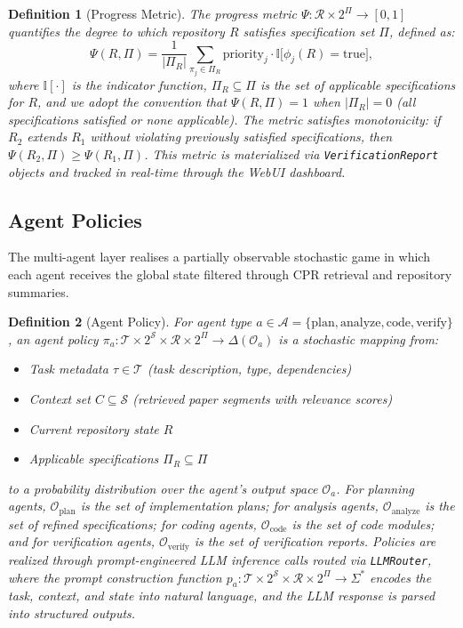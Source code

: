 \documentclass{ieeeaccess}
\newtheorem{definition}{Definition}
\begin{document}
\begin{definition}[Progress Metric]
The progress metric \(\Psi: \mathcal{R} \times 2^{\Pi} \to [0,1]\) quantifies the degree to which repository \(R\) satisfies specification set \(\Pi\), defined as:
\begin{equation}
\Psi(R, \Pi) = \frac{1}{|\Pi_R|} \sum_{\pi_j \in \Pi_R} \text{priority}_j \cdot \mathbb{I}\bigl[\phi_j(R) = \text{true}\bigr],
\label{eq:progress}
\end{equation}
where \(\mathbb{I}[\cdot]\) is the indicator function, \(\Pi_R \subseteq \Pi\) is the set of applicable specifications for \(R\), and we adopt the convention that \(\Psi(R, \Pi) = 1\) when \(|\Pi_R| = 0\) (all specifications satisfied or none applicable). The metric satisfies monotonicity: if \(R_2\) extends \(R_1\) without violating previously satisfied specifications, then \(\Psi(R_2, \Pi) \geq \Psi(R_1, \Pi)\). This metric is materialized via \texttt{VerificationReport} objects and tracked in real-time through the WebUI dashboard.
\end{definition}

\subsection{Agent Policies}
The multi-agent layer realises a partially observable stochastic game in which each agent receives the global state filtered through CPR retrieval and repository summaries.

\begin{definition}[Agent Policy]
For agent type \(a \in \mathcal{A} = \{\text{plan}, \text{analyze}, \text{code}, \text{verify}\}\), an agent policy \(\pi_a: \mathcal{T} \times 2^{\mathcal{S}} \times \mathcal{R} \times 2^{\Pi} \to \Delta(\mathcal{O}_a)\) is a stochastic mapping from:
\begin{itemize}
\item Task metadata \(\tau \in \mathcal{T}\) (task description, type, dependencies)
\item Context set \(C \subseteq \mathcal{S}\) (retrieved paper segments with relevance scores)
\item Current repository state \(R\)
\item Applicable specifications \(\Pi_R \subseteq \Pi\)
\end{itemize}
to a probability distribution over the agent's output space \(\mathcal{O}_a\). For planning agents, \(\mathcal{O}_{\text{plan}}\) is the set of implementation plans; for analysis agents, \(\mathcal{O}_{\text{analyze}}\) is the set of refined specifications; for coding agents, \(\mathcal{O}_{\text{code}}\) is the set of code modules; and for verification agents, \(\mathcal{O}_{\text{verify}}\) is the set of verification reports. Policies are realized through prompt-engineered LLM inference calls routed via \texttt{LLMRouter}, where the prompt construction function \(p_a: \mathcal{T} \times 2^{\mathcal{S}} \times \mathcal{R} \times 2^{\Pi} \to \Sigma^*\) encodes the task, context, and state into natural language, and the LLM response is parsed into structured outputs.
\end{definition}
\end{document}
